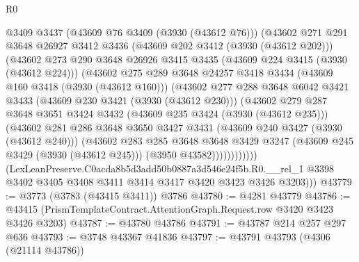 \begin{lexlean}{R0}
\begin{coremodule}
                @3409
                @3437
                (@43609 @76 @3409 (@3930 (@43612 @76)))
                (@43602
                  @271
                  @291
                  @3648
                  @26927
                  @3412
                  @3436
                  (@43609 @202 @3412 (@3930 (@43612 @202)))
                  (@43602
                    @273
                    @290
                    @3648
                    @26926
                    @3415
                    @3435
                    (@43609 @224 @3415 (@3930 (@43612 @224)))
                    (@43602
                      @275
                      @289
                      @3648
                      @24257
                      @3418
                      @3434
                      (@43609 @160 @3418 (@3930 (@43612 @160)))
                      (@43602
                        @277
                        @288
                        @3648
                        @6042
                        @3421
                        @3433
                        (@43609 @230 @3421 (@3930 (@43612 @230)))
                        (@43602
                          @279
                          @287
                          @3648
                          @3651
                          @3424
                          @3432
                          (@43609 @235 @3424 (@3930 (@43612 @235)))
                          (@43602
                            @281
                            @286
                            @3648
                            @3650
                            @3427
                            @3431
                            (@43609 @240 @3427 (@3930 (@43612 @240)))
                            (@43602
                              @283
                              @285
                              @3648
                              @3648
                              @3429
                              @3247
                              (@43609 @245 @3429 (@3930 (@43612 @245)))
                              (@3950 @43582))))))))))))
        (LexLeanPreserve.C0acda8b5d3add50b0887a3d546e24f5b.R0.__rel_1
          @3398
          @3402
          @3405
          @3408
          @3411
          @3414
          @3417
          @3420
          @3423
          @3426
          @3203)))
@43779 := @3773 (@3783 (@43415 @3411)) @3786
@43780 := @4281 @43779
@43786 := @43415 (PrismTemplateContract.AttentionGraph.Request.row @3420 @3423 @3426 @3203)
@43787 := @43780 @43786
@43791 := @43787 @214 @257 @297 @636
@43793 := @3748 @43367 @41836
@43797 := @43791 @43793 (@4306 (@21114 @43786))

\end{coremodule}
\end{lexlean}
